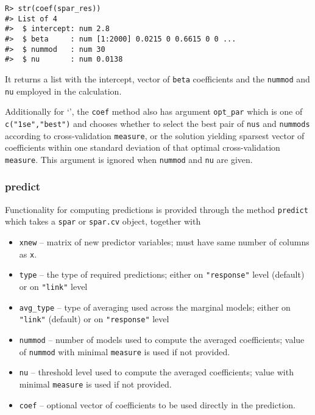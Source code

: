 \documentclass[
  article]{jss}
\newcommand{\class}[1]{`\code{#1}'}
\begin{document}
\begin{verbatim}
R> str(coef(spar_res))
#> List of 4
#>  $ intercept: num 2.8
#>  $ beta     : num [1:2000] 0.0215 0 0.6615 0 0 ...
#>  $ nummod   : num 30
#>  $ nu       : num 0.0138
\end{verbatim}

It returns a list with the intercept, vector of \texttt{beta}
coefficients and the \texttt{nummod} and \texttt{nu} employed in the
calculation.

Additionally for \class{spar.cv}, the \texttt{coef} method also has
argument \texttt{opt\_par} which is one of \texttt{c("1se","best")} and
chooses whether to select the best pair of \texttt{nus} and
\texttt{nummods} according to cross-validation \texttt{measure}, or the
solution yielding sparsest vector of coefficients within one standard
deviation of that optimal cross-validation \texttt{measure}. This
argument is ignored when \texttt{nummod} and \texttt{nu} are given.

\subsubsection{predict}\label{predict}

Functionality for computing predictions is provided through the method
\texttt{predict} which takes a \texttt{spar} or \texttt{spar.cv} object,
together with

\begin{itemize}
\item
  \texttt{xnew} -- matrix of new predictor variables; must have same
  number of columns as \texttt{x}.
\item
  \texttt{type} -- the type of required predictions; either on
  \texttt{"response"} level (default) or on \texttt{"link"} level
\item
  \texttt{avg\_type} -- type of averaging used across the marginal
  models; either on \texttt{"link"} (default) or on \texttt{"response"}
  level
\item
  \texttt{nummod} -- number of models used to compute the averaged
  coefficients; value of \texttt{nummod} with minimal \texttt{measure}
  is used if not provided.
\item
  \texttt{nu} -- threshold level used to compute the averaged
  coefficients; value with minimal \texttt{measure} is used if not
  provided.
\item
  \texttt{coef} -- optional vector of coefficients to be used directly
  in the prediction.
\end{itemize}
\end{document}
